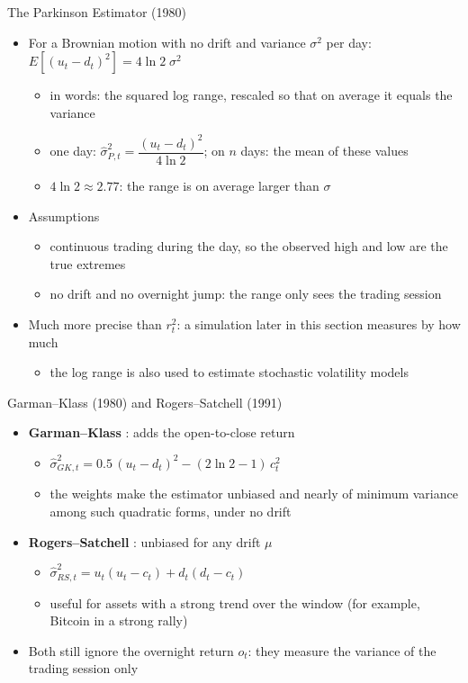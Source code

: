 \begin{frame}{The Parkinson Estimator (1980)}
\itemsize{\small}
\begin{itemize}
    \item For a Brownian motion with no drift and variance $\sigma^2$ per day: $E[(u_t - d_t)^2] = 4\ln 2\;\sigma^2$ 
    \begin{itemize}
        \item in words: the squared log range, rescaled so that on average it equals the variance
        \item one day: $\hat\sigma_{P,t}^2 = \dfrac{(u_t - d_t)^2}{4\ln 2}$; on $n$ days: the mean of these values
        \item $4\ln 2 \approx 2.77$: the range is on average larger than $\sigma$
    \end{itemize}
    \item Assumptions
    \begin{itemize}
        \item continuous trading during the day, so the observed high and low are the true extremes
        \item no drift and no overnight jump: the range only sees the trading session
    \end{itemize}
    \item Much more precise than $r_t^2$: a simulation later in this section measures by how much
    \begin{itemize}
        \item the log range is also used to estimate stochastic volatility models 
    \end{itemize}
\end{itemize}
\end{frame}

\begin{frame}{Garman--Klass (1980) and Rogers--Satchell (1991)}
\itemsize{\small}
\begin{itemize}
    \item \textbf{Garman--Klass} : adds the open-to-close return
    \begin{itemize}
        \item $\hat\sigma_{GK,t}^2 = 0.5\,(u_t - d_t)^2 - (2\ln 2 - 1)\,c_t^2$
        \item the weights make the estimator unbiased and nearly of minimum variance among such quadratic forms, under no drift
    \end{itemize}
    \item \textbf{Rogers--Satchell} : unbiased for any drift $\mu$
    \begin{itemize}
        \item $\hat\sigma_{RS,t}^2 = u_t(u_t - c_t) + d_t(d_t - c_t)$
        \item useful for assets with a strong trend over the window (for example, Bitcoin in a strong rally)
    \end{itemize}
    \item Both still ignore the overnight return $o_t$: they measure the variance of the trading session only
\end{itemize}
\end{frame}

